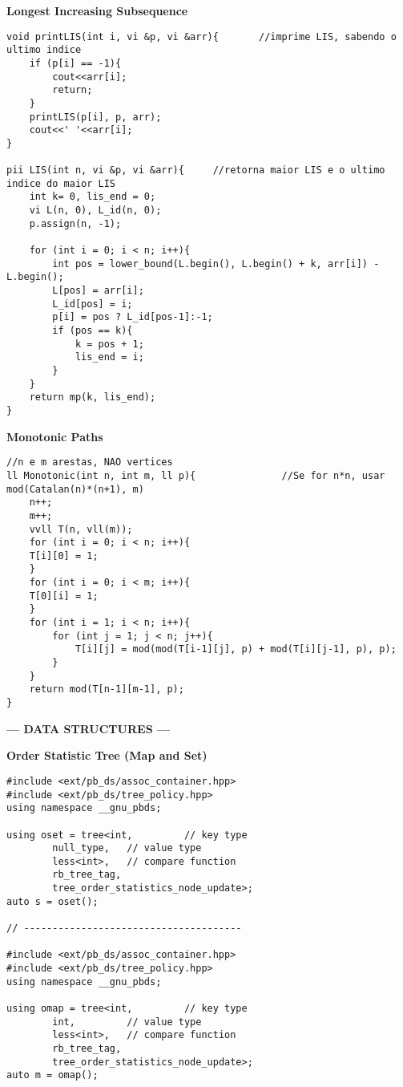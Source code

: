 \documentclass{article}
\begin{document}
\begin{multicols}{2}
\large
\huge\textbf{Longest Increasing Subsequence}
\large
\begin{lstlisting}
void printLIS(int i, vi &p, vi &arr){       //imprime LIS, sabendo o ultimo indice
	if (p[i] == -1){
		cout<<arr[i];
		return;
	}
	printLIS(p[i], p, arr);
	cout<<' '<<arr[i];
}

pii LIS(int n, vi &p, vi &arr){     //retorna maior LIS e o ultimo indice do maior LIS
	int k= 0, lis_end = 0;
	vi L(n, 0), L_id(n, 0);
	p.assign(n, -1);

	for (int i = 0; i < n; i++){
		int pos = lower_bound(L.begin(), L.begin() + k, arr[i]) - L.begin();
		L[pos] = arr[i];
		L_id[pos] = i;
		p[i] = pos ? L_id[pos-1]:-1;
		if (pos == k){
			k = pos + 1;
			lis_end = i;
		}
	}
	return mp(k, lis_end);
}
\end{lstlisting}


\large
\huge\textbf{Monotonic Paths}
\large
\begin{lstlisting}
//n e m arestas, NAO vertices
ll Monotonic(int n, int m, ll p){				//Se for n*n, usar mod(Catalan(n)*(n+1), m)
	n++;
	m++;
	vvll T(n, vll(m));
	for (int i = 0; i < n; i++){
	T[i][0] = 1;
	}
	for (int i = 0; i < m; i++){
	T[0][i] = 1;
	}
	for (int i = 1; i < n; i++){
		for (int j = 1; j < n; j++){
			T[i][j] = mod(mod(T[i-1][j], p) + mod(T[i][j-1], p), p);
		}
	}
	return mod(T[n-1][m-1], p);
}
\end{lstlisting}


\large
\begin{center}
\huge\textbf{--- DATA STRUCTURES ---}
\end{center}
\large

\huge\textbf{Order Statistic Tree (Map and Set)}
\begin{lstlisting}
#include <ext/pb_ds/assoc_container.hpp>
#include <ext/pb_ds/tree_policy.hpp>
using namespace __gnu_pbds;

using oset = tree<int,         // key type
		null_type,   // value type
		less<int>,   // compare function
		rb_tree_tag,
		tree_order_statistics_node_update>;
auto s = oset();

// --------------------------------------

#include <ext/pb_ds/assoc_container.hpp>
#include <ext/pb_ds/tree_policy.hpp>
using namespace __gnu_pbds;

using omap = tree<int,         // key type
		int,         // value type
		less<int>,   // compare function
		rb_tree_tag,
		tree_order_statistics_node_update>;
auto m = omap();


\end{lstlisting}
\end{multicols}
\end{document}
